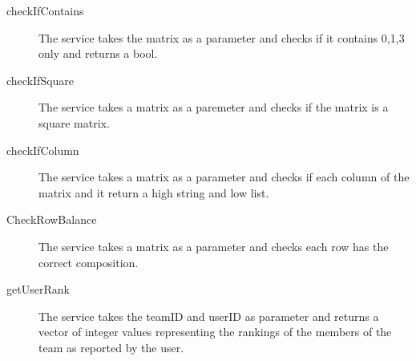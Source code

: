 \begin{description}
	
	\item[checkIfContains] The service takes the matrix as a parameter and checks if it contains 0,1,3 only and returns a bool.
	
	\item[checkIfSquare] The service takes a matrix as a paremeter and checks if the matrix is a square matrix.
	
	\item[checkIfColumn] The service takes a matrix as a parameter and checks if each column of the matrix and it return a high string and low list.
	
	\item[CheckRowBalance] The service takes a matrix as a parameter and checks each row has the correct composition.
	
	\item[getUserRank] The service takes the teamID and userID as parameter and returns a vector of integer values representing the rankings of the members of the team as reported by the user. 
	
	
	
\end{description}









